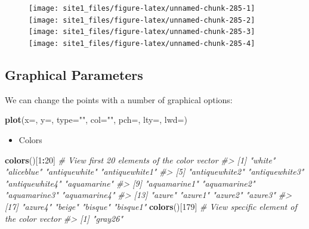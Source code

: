 \documentclass[]{book}
\newenvironment{Shaded}{\begin{snugshade}}{\end{snugshade}}
\newcommand{\KeywordTok}[1]{\textcolor[rgb]{0.13,0.29,0.53}{\textbf{#1}}}
\newcommand{\DataTypeTok}[1]{\textcolor[rgb]{0.13,0.29,0.53}{#1}}
\newcommand{\DecValTok}[1]{\textcolor[rgb]{0.00,0.00,0.81}{#1}}
\newcommand{\StringTok}[1]{\textcolor[rgb]{0.31,0.60,0.02}{#1}}
\newcommand{\CommentTok}[1]{\textcolor[rgb]{0.56,0.35,0.01}{\textit{#1}}}
\newcommand{\OperatorTok}[1]{\textcolor[rgb]{0.81,0.36,0.00}{\textbf{#1}}}
\newcommand{\NormalTok}[1]{#1}
\providecommand{\tightlist}{%
  \setlength{\itemsep}{0pt}\setlength{\parskip}{0pt}}
\begin{document}
\begin{figure}

{\centering \texttt{[image: site1\_files/figure-latex/unnamed-chunk-285-1]} \texttt{[image: site1\_files/figure-latex/unnamed-chunk-285-2]} \texttt{[image: site1\_files/figure-latex/unnamed-chunk-285-3]} \texttt{[image: site1\_files/figure-latex/unnamed-chunk-285-4]} 

}

\caption{ }\label{fig:unnamed-chunk-285}
\end{figure}

\subsection{Graphical Parameters}\label{graphical-parameters}

We can change the points with a number of graphical options:

\begin{Shaded}
\begin{Highlighting}[]
\KeywordTok{plot}\NormalTok{(}\DataTypeTok{x=}\NormalTok{, }\DataTypeTok{y=}\NormalTok{, }\DataTypeTok{type=}\StringTok{""}\NormalTok{, }\DataTypeTok{col=}\StringTok{""}\NormalTok{, }\DataTypeTok{pch=}\NormalTok{, }\DataTypeTok{lty=}\NormalTok{, }\DataTypeTok{lwd=}\NormalTok{)}
\end{Highlighting}
\end{Shaded}

\begin{itemize}
\tightlist
\item
  Colors
\end{itemize}

\begin{Shaded}
\begin{Highlighting}[]
\KeywordTok{colors}\NormalTok{()[}\DecValTok{1}\OperatorTok{:}\DecValTok{20}\NormalTok{] }\CommentTok{# View first 20 elements of the color vector}
\CommentTok{#>  [1] "white"         "aliceblue"     "antiquewhite"  "antiquewhite1"}
\CommentTok{#>  [5] "antiquewhite2" "antiquewhite3" "antiquewhite4" "aquamarine"   }
\CommentTok{#>  [9] "aquamarine1"   "aquamarine2"   "aquamarine3"   "aquamarine4"  }
\CommentTok{#> [13] "azure"         "azure1"        "azure2"        "azure3"       }
\CommentTok{#> [17] "azure4"        "beige"         "bisque"        "bisque1"}
\KeywordTok{colors}\NormalTok{()[}\DecValTok{179}\NormalTok{] }\CommentTok{# View specific element of the color vector}
\CommentTok{#> [1] "gray26"}
\end{Highlighting}
\end{Shaded}
\end{document}
